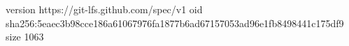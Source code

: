 version https://git-lfs.github.com/spec/v1
oid sha256:5eaec3b98cce186a61067976fa1877b6ad67157053ad96e1fb8498441c175df9
size 1063
